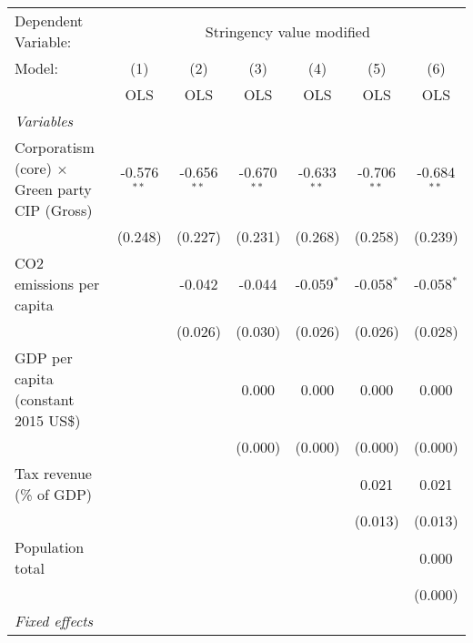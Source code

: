 
\begingroup
\centering
\begin{tabular}{lcccccc}
   \toprule
   Dependent Variable: & \multicolumn{6}{c}{Stringency value modified}\\
   Model:                                               & (1)           & (2)           & (3)           & (4)           & (5)           & (6)\\  
                                                        &  OLS          & OLS           & OLS           & OLS           & OLS           & OLS\\  
   \midrule
   \emph{Variables}\\
   Corporatism (core) $\times$ Green party CIP (Gross)  & -0.576$^{**}$ & -0.656$^{**}$ & -0.670$^{**}$ & -0.633$^{**}$ & -0.706$^{**}$ & -0.684$^{**}$\\   
                                                        & (0.248)       & (0.227)       & (0.231)       & (0.268)       & (0.258)       & (0.239)\\   
   CO2 emissions per capita                             &               & -0.042        & -0.044        & -0.059$^{*}$  & -0.058$^{*}$  & -0.058$^{*}$\\   
                                                        &               & (0.026)       & (0.030)       & (0.026)       & (0.026)       & (0.028)\\   
   GDP per capita (constant 2015 US\$)                  &               &               & 0.000         & 0.000         & 0.000         & 0.000\\   
                                                        &               &               & (0.000)       & (0.000)       & (0.000)       & (0.000)\\   
   Tax revenue (\% of GDP)                              &               &               &               &               & 0.021         & 0.021\\   
                                                        &               &               &               &               & (0.013)       & (0.013)\\   
   Population total                                     &               &               &               &               &               & 0.000\\   
                                                        &               &               &               &               &               & (0.000)\\   
   \emph{Fixed effects}\\

\end{tabular}
